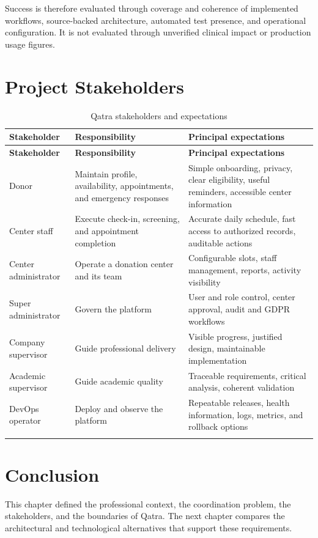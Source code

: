 Success is therefore evaluated through coverage and coherence of implemented workflows, source-backed architecture, automated test presence, and operational configuration. It is not evaluated through unverified clinical impact or production usage figures.

\newpage
\section{Project Stakeholders}
\begin{longtable}{|P{3.0cm}|P{4.1cm}|P{6.3cm}|}
\hline
{}\textbf{Stakeholder} & \textbf{Responsibility} & \textbf{Principal expectations}\\ \hline
\endfirsthead
\hline{}\textbf{Stakeholder} & \textbf{Responsibility} & \textbf{Principal expectations}\\ \hline
\endhead
Donor & Maintain profile, availability, appointments, and emergency responses & Simple onboarding, privacy, clear eligibility, useful reminders, accessible center information\\ \hline
Center staff & Execute check-in, screening, and appointment completion & Accurate daily schedule, fast access to authorized records, auditable actions\\ \hline
Center administrator & Operate a donation center and its team & Configurable slots, staff management, reports, activity visibility\\ \hline
Super administrator & Govern the platform & User and role control, center approval, audit and GDPR workflows\\ \hline
Company supervisor & Guide professional delivery & Visible progress, justified design, maintainable implementation\\ \hline
Academic supervisor & Guide academic quality & Traceable requirements, critical analysis, coherent validation\\ \hline
DevOps operator & Deploy and observe the platform & Repeatable releases, health information, logs, metrics, and rollback options\\ \hline
\caption{Qatra stakeholders and expectations}
\label{tab:stakeholders}
\end{longtable}

\section*{Conclusion}
This chapter defined the professional context, the coordination problem, the stakeholders, and the boundaries of Qatra. The next chapter compares the architectural and technological alternatives that support these requirements.
